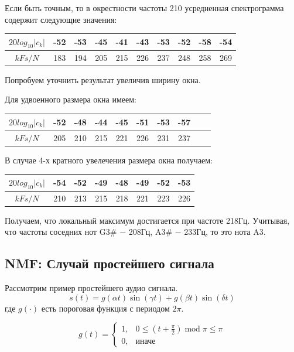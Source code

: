 \documentclass[oneside, final, 12pt]{extarticle}
\begin{document}
  Если быть точным, то в окрестности частоты 210 усредненная спектрограмма
  содержит следующие значения:

  \begin{tabular}[t]{|c|c|c|c|c|c|c|c|c|c|}
    \hline
    $20 log_{10}|c_k|$ & -52 & -53 & -45
      & -41 & -43 & -53 & -52 & -58 & -54 \\
    \hline
    $k Fs/N$ & 183 & 194 & 205
      & 215 & 226 & 237 & 248 & 258 & 269 \\
    \hline
  \end{tabular}

  Попробуем уточнить результат увеличив ширину окна.

  Для удвоенного размера окна имеем:

  \begin{tabular}[t]{|c|c|c|c|c|c|c|c|c|c|}
    \hline
    $20 log_{10}|c_k|$ & -52 & -48 & -44 & -45 & -51 & -53 & -57 \\
    \hline
    $k Fs/N$ & 205 & 210 & 215 & 221 & 226 & 231 & 237 \\
    \hline
  \end{tabular}

  В случае 4-х кратного увелечения размера окна получаем:

  \begin{tabular}[t]{|c|c|c|c|c|c|c|c|}
    \hline
    $20 log_{10}|c_k|$ & -54 & -52 & -49 & -48 & -49 & -52 & -53 \\
    \hline
    $k Fs/N$ & 210 & 213 & 215 & 218 & 221 & 223 & 226 \\
    \hline
  \end{tabular}


  Получаем, что локальный максимум достигается при частоте 218Гц. Учитывая,
  что частоты соседних нот G3\# $-$ 208Гц, A3\# $-$ 233Гц, то это нота A3.

\cleardoublepage

\subsection{NMF: Случай простейшего сигнала}

Рассмотрим пример простейшего аудио сигнала.
\[
  s(t) = g(\alpha t) \sin(\gamma t) + g(\beta t) \sin(\delta t)
\]
где $g(\cdot)$ есть пороговая функция с периодом $2\pi$.

\[
  g(t) =
  \begin{cases}
    1, & 0 \leqslant \left( t + \frac{\pi}{2} \right)
      \; \text{mod} \; \pi \leqslant \pi \\
    0, & \text{иначе}
  \end{cases}
\]
\end{document}
